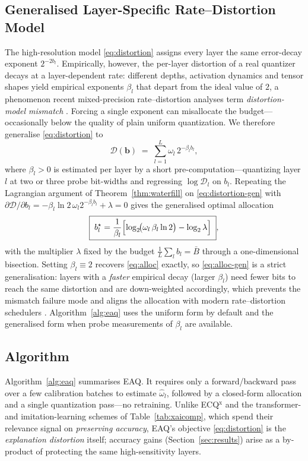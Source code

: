 \subsection{Generalised Layer-Specific Rate--Distortion Model}
\label{sec:eaq-general}
The high-resolution model \eqref{eq:distortion} assigns every layer the same
error-decay exponent $2^{-2b_l}$. Empirically, however, the per-layer distortion
of a real quantizer decays at a layer-dependent rate: different depths,
activation dynamics and tensor shapes yield empirical exponents $\beta_l$ that
depart from the ideal value of $2$, a phenomenon recent mixed-precision
rate--distortion analyses term \emph{distortion-model mismatch}
\cite{ranjan2025mixqvit,li2024rdkv}. Forcing a single exponent can misallocate
the budget---occasionally below the quality of plain uniform quantization. We
therefore generalise \eqref{eq:distortion} to
\begin{equation}
\mathcal D(\bm b)\;=\;\sum_{l=1}^{L}\omega_l\,2^{-\beta_l b_l},
\label{eq:distortion-gen}
\end{equation}
where $\beta_l>0$ is estimated per layer by a short pre-computation---quantizing
layer $l$ at two or three probe bit-widths and regressing $\log\mathcal D_l$ on
$b_l$. Repeating the Lagrangian argument of Theorem~\ref{thm:waterfill} on
\eqref{eq:distortion-gen} with $\partial\mathcal D/\partial b_l=
-\beta_l\ln2\,\omega_l2^{-\beta_l b_l}+\lambda=0$ gives the generalised optimal
allocation
\begin{equation}
\boxed{\;b_l^{\star}=\frac{1}{\beta_l}\Bigl[\log_2\!\bigl(\omega_l\,\beta_l\ln2
\bigr)-\log_2\lambda\Bigr]\;},
\label{eq:alloc-gen}
\end{equation}
with the multiplier $\lambda$ fixed by the budget $\tfrac1L\sum_l b_l=\bar B$
through a one-dimensional bisection. Setting $\beta_l\equiv2$ recovers
\eqref{eq:alloc} exactly, so \eqref{eq:alloc-gen} is a strict generalisation:
layers with a \emph{faster} empirical decay (larger $\beta_l$) need fewer bits to
reach the same distortion and are down-weighted accordingly, which prevents the
mismatch failure mode and aligns the allocation with modern rate--distortion
schedulers \cite{li2024rdkv}. Algorithm~\ref{alg:eaq} uses the uniform form by
default and the generalised form when probe measurements of $\beta_l$ are
available.

\subsection{Algorithm}
Algorithm~\ref{alg:eaq} summarises EAQ. It requires only a forward/backward pass
over a few calibration batches to estimate $\hat\omega_l$, followed by a
closed-form allocation and a single quantization pass---no retraining. Unlike
ECQ$^{\mathrm x}$ \cite{becking2022ecq} and the transformer- and
imitation-learning schemes of Table~\ref{tab:xaicomp}, which spend their
relevance signal on \emph{preserving accuracy}, EAQ's objective
\eqref{eq:distortion} is the \emph{explanation distortion} itself; accuracy gains
(Section~\ref{sec:results}) arise as a by-product of protecting the same
high-sensitivity layers.


